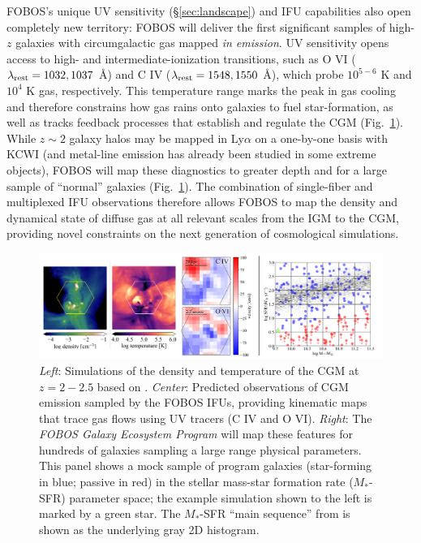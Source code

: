 \documentclass[11pt,a4paper,twoside,onecolumn,openany,final,oldfontcommands]{memoir}
\begin{document}
FOBOS's unique UV sensitivity (\S \ref{sec:landscape}) and IFU capabilities also open completely new territory: FOBOS will deliver the first significant samples of high-$z$ galaxies with circumgalactic gas mapped \emph{in emission}. UV sensitivity opens access to high- and intermediate-ionization transitions, such as O VI ($\lambda_{\rm rest} = 1032, 1037$ \AA) and C IV ($\lambda_{\rm rest} = 1548, 1550$ \AA), which probe $10^{5-6}$ K and $10^4$ K gas, respectively.  This temperature range marks the peak in gas cooling and therefore constrains how gas rains onto galaxies to fuel star-formation, as well as tracks feedback processes that establish and regulate the CGM (Fig.~\ref{fig:cgmsample}).  While $z\sim2$ galaxy halos may be mapped in Ly$\alpha$ on a one-by-one basis with KCWI (and metal-line emission has already been studied in some extreme objects), FOBOS will map these diagnostics to greater depth and for a large sample of ``normal'' galaxies (Fig.~\ref{fig:cgmsample}).  The combination of single-fiber and multiplexed IFU observations therefore allows FOBOS to map the density and dynamical state of diffuse gas at all relevant scales from the IGM to the CGM, providing novel constraints on the next generation of cosmological simulations.

\begin{figure}
\includegraphics[width=\textwidth]{figs/msipProposalCgmCombo.pdf} %
\caption{\footnotesize \textit{Left}: Simulations of the density and temperature of the CGM at $z=2-2.5$ based on \citet{Corlies:2018aa}. \textit{Center}: Predicted observations of CGM emission sampled by the FOBOS IFUs, providing kinematic maps that trace gas flows using UV tracers (C IV and O VI).  \textit{Right}: The \textit{FOBOS Galaxy Ecosystem Program} will map these features for hundreds of galaxies sampling a large range physical parameters.  This panel shows a mock sample of program galaxies (star-forming in blue; passive in red) in the stellar mass-star formation rate ($M_*$-SFR) parameter space; the example simulation shown to the left is marked by a green star. The $M_*$-SFR ``main sequence'' from \citet{Whitaker:2012} is shown as the underlying gray 2D histogram.}
\label{fig:cgmsample}
\end{figure}
\end{document}
